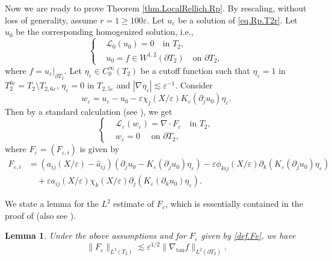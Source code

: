 \documentclass[reqno,12pt]{amsart} %
\newtheorem{lemma}[theorem]{Lemma}
\theoremstyle{definition}
\theoremstyle{remark}
\numberwithin{equation}{section}
\newcommand{\cL}{\mathcal{L}}
\newcommand{\e}{\varepsilon}
\begin{document}
Now we are ready to prove Theorem \ref{thm.LocalRellich.Rp}.
By rescaling, without loss of generality, assume $r = 1 \ge 100 \e$. Let $u_\e$ be a solution of \eqref{eq.Rp.T2r}. Let $u_0$ be the corresponding homogenized solution,  i.e.,
    \begin{equation}\label{eq.L0Rp.T2r}
    \left\{
    \begin{aligned}
        & \cL_0(u_0) = 0 \quad \text{in } T_{2}, \\
        & u_0 = f \in W^{1,2}(\partial T_{2}) \quad \text{on } \partial T_{2},
    \end{aligned}
    \right.
    \end{equation}
    where $f=u_\e|_{\partial T_{2}}$.
Let $\eta_\e \in C_0^\infty(T_{2})$ be a cutoff function such that $\eta_\e = 1$ in $T_{2}^{6\e} = T_2 \setminus T_{2,6\e}$, $\eta_\e = 0$ in $T_{2,5\e}$ and $|\nabla \eta_\e| \lesssim \e^{-1}$.
Consider
\begin{equation}\label{def.we}
    w_\e = u_\e - u_0 - \e \chi_j(X/\e) K_\e (\partial_j u_0) \eta_\e.
\end{equation}
Then by a standard calculation (see \cite[Lemma 7.3]{Shen17}), we get
\begin{equation}\label{eq.we.inT2}
\left\{
\begin{aligned}
    & \cL_\e(w_\e) = \nabla\cdot F_\e \quad \text{in } T_2,\\
    & w_\e = 0 \quad \text{ on } \partial T_2,
\end{aligned}
    \right.
\end{equation} %
where $F_\e = (F_{\e,i})$ is given by
\begin{equation}\label{def.Fe}
\begin{aligned}
    F_{\e,i} & = (a_{ij}(X/\e) - \widehat{a}_{ij})(\partial_j u_0 - K_\e(\partial_j u_0) \eta_\e ) - \e \phi_{kij}(X/\e) \partial_k (K_\e(\partial_j u_0) \eta_\e )  \\
    & \quad  + \e a_{ij}(X/\e) \chi_k(X/\e) \partial_j ( K_\e (\partial_k u_0 ) \eta_\e).
\end{aligned}
\end{equation}

We state a lemma for the $L^2$ estimate of $F_\e$, which is essentially contained in the proof of \cite[Theorem 2.6]{Shen17} (also see \cite[Theorem 3.2.3]{ShenBook}).

\begin{lemma}\label{lem.weL2}
Under the above assumptions and for $F_\e$ given by \eqref{def.Fe}, we have
\begin{equation}\label{est.MeFe1}
    \| F_\e \|_{L^2(T_2)} \lesssim \e^{1/2} \| \nabla_{\tan} f \|_{L^2(\partial T_2)}.
\end{equation}
\end{lemma}
\end{document}
